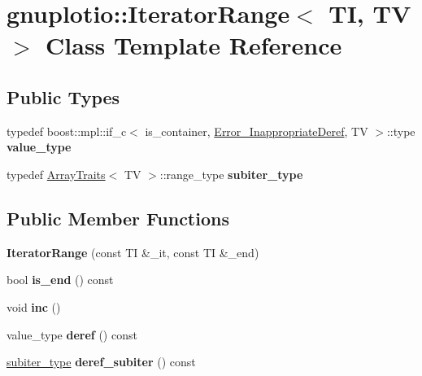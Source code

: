 \hypertarget{classgnuplotio_1_1IteratorRange}{}\section{gnuplotio\+:\+:Iterator\+Range$<$ TI, TV $>$ Class Template Reference}
\label{classgnuplotio_1_1IteratorRange}
\subsection*{Public Types}
\begin{DoxyCompactItemize}
\item 
\mbox{\label{classgnuplotio_1_1IteratorRange_a3d997739282df372a894c586c64a0687}} 
typedef boost\+::mpl\+::if\+\_\+c$<$ is\+\_\+container, \mbox{\hyperlink{structgnuplotio_1_1Error__InappropriateDeref}{Error\+\_\+\+Inappropriate\+Deref}}, TV $>$\+::type {\bfseries value\+\_\+type}
\item 
\mbox{\label{classgnuplotio_1_1IteratorRange_a566ca30462a029f6df4ef16116f99acd}} 
typedef \mbox{\hyperlink{classgnuplotio_1_1ArrayTraits}{Array\+Traits}}$<$ TV $>$\+::range\+\_\+type {\bfseries subiter\+\_\+type}
\end{DoxyCompactItemize}
\subsection*{Public Member Functions}
\begin{DoxyCompactItemize}
\item 
\mbox{\label{classgnuplotio_1_1IteratorRange_adb89135fc292dfc5152120bc7fe6135e}} 
{\bfseries Iterator\+Range} (const TI \&\+\_\+it, const TI \&\+\_\+end)
\item 
\mbox{\label{classgnuplotio_1_1IteratorRange_a966a08441bdd5f5e76e37ef06f507ad7}} 
bool {\bfseries is\+\_\+end} () const
\item 
\mbox{\label{classgnuplotio_1_1IteratorRange_a369f392a561011f8f1c93d13fd976878}} 
void {\bfseries inc} ()
\item 
\mbox{\label{classgnuplotio_1_1IteratorRange_a516ffb8c3716ef5e30f067b595f7dbfb}} 
value\+\_\+type {\bfseries deref} () const
\item 
\mbox{\label{classgnuplotio_1_1IteratorRange_a34ef78d431ad8a643d412851016b2122}} 
\mbox{\hyperlink{structgnuplotio_1_1Error__WasNotContainer}{subiter\+\_\+type}} {\bfseries deref\+\_\+subiter} () const
\end{DoxyCompactItemize}
